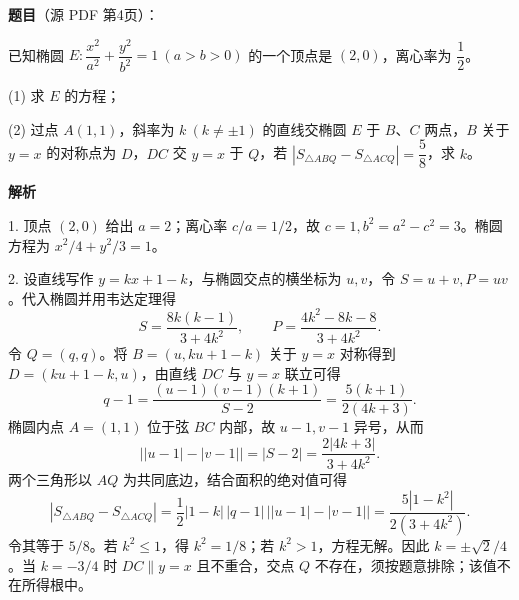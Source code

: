 \begin{answer}

\textbf{题目}（源 PDF 第4页）：

已知椭圆 \(E:\dfrac{x^2}{a^2}+\dfrac{y^2}{b^2}=1\ (a>b>0)\) 的一个顶点是 \((2,0)\)，离心率为 \(\dfrac{1}{2}\)。

(1) 求 \(E\) 的方程；

(2) 过点 \(A(1,1)\)，斜率为 \(k\ (k\ne\pm1)\) 的直线交椭圆 \(E\) 于 \(B\text{、}C\) 两点，\(B\) 关于 \(y=x\) 的对称点为 \(D\)，\(DC\) 交 \(y=x\) 于 \(Q\)，若 \(\left\lvert S_{\triangle ABQ}-S_{\triangle ACQ}\right\rvert=\dfrac{5}{8}\)，求 \(k\)。

\textbf{解析}


1. 顶点 \((2,0)\) 给出 \(a=2\)；离心率 \(c/a=1/2\)，故 \(c=1,b^2=a^2-c^2=3\)。椭圆方程为 \(x^2/4+y^2/3=1\)。

2. 设直线写作 \(y=kx+1-k\)，与椭圆交点的横坐标为 \(u,v\)，令 \(S=u+v,P=uv\)。代入椭圆并用韦达定理得
\nopagebreak[4]
\[
   S=\frac{8k(k-1)}{3+4k^2},\qquad P=\frac{4k^2-8k-8}{3+4k^2}.
\]
   令 \(Q=(q,q)\)。将 \(B=(u,ku+1-k)\) 关于 \(y=x\) 对称得到 \(D=(ku+1-k,u)\)，由直线 \(DC\) 与 \(y=x\) 联立可得
\nopagebreak[4]
\[
   q-1=\frac{(u-1)(v-1)(k+1)}{S-2}=\frac{5(k+1)}{2(4k+3)}.
\]
   椭圆内点 \(A=(1,1)\) 位于弦 \(BC\) 内部，故 \(u-1,v-1\) 异号，从而
\nopagebreak[4]
\[
   \bigl||u-1|-|v-1|\bigr|=|S-2|=\frac{2|4k+3|}{3+4k^2}.
\]
   两个三角形以 \(AQ\) 为共同底边，结合面积的绝对值可得
\nopagebreak[4]
\[
   \left|S_{\triangle ABQ}-S_{\triangle ACQ}\right|
   =\frac12|1-k|\,|q-1|\,\bigl||u-1|-|v-1|\bigr|
   =\frac{5|1-k^2|}{2(3+4k^2)}.
\]
   令其等于 \(5/8\)。若 \(k^2\le1\)，得 \(k^2=1/8\)；若 \(k^2>1\)，方程无解。因此 \(k=\pm\sqrt2/4\)。当 \(k=-3/4\) 时 \(DC\parallel y=x\) 且不重合，交点 \(Q\) 不存在，须按题意排除；该值不在所得根中。



\end{answer}
